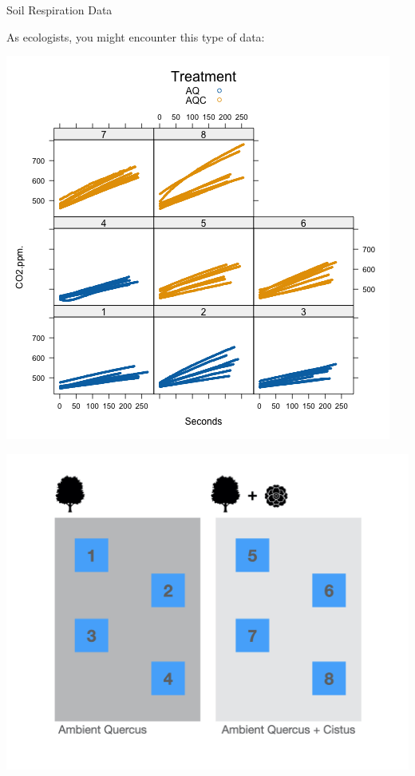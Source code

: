 \documentclass{beamer}
\begin{document}
\begin{frame}{Soil Respiration Data}

As ecologists, you might encounter this type of data:
\begin{center}
  \begin{minipage}{0.45\linewidth}
    \centering
    \includegraphics[width=\linewidth]{lectures/day_1_intro_to_mems/figures/plot_1.png}
  \end{minipage}
  \hspace{0.05\linewidth}  %
  \begin{minipage}{0.45\linewidth}
    \centering
    \includegraphics[width=\linewidth]{lectures/day_1_intro_to_mems/figures/respiration.jpeg}
  \end{minipage}
\end{center}


\end{frame}
\end{document}
